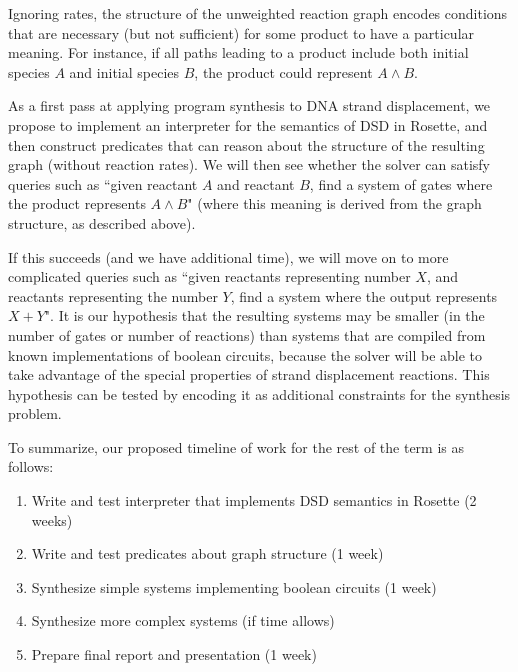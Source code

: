 \documentclass{article}
\begin{document}
Ignoring rates, the structure of the unweighted reaction graph encodes
conditions that are necessary (but not sufficient) for some product to have a
particular meaning. For instance, if all paths leading to a product include both
initial species $A$ and initial species $B$, the product could
represent $A \land B$.

As a first pass at applying program synthesis to DNA strand displacement, we
propose to implement an interpreter for the semantics of DSD in Rosette, and
then construct predicates that can reason about the structure of the resulting
graph (without reaction rates). We will then see whether the solver can satisfy
queries such as ``given reactant $A$ and reactant $B$, find a system of gates
where the product represents $A \land B$" (where this meaning is derived from
the graph structure, as described above).

If this succeeds (and we have additional time), we will move on to more
complicated queries such as ``given reactants representing number $X$, and
reactants representing the number $Y$, find a system where the output represents
$X + Y$".  It is our hypothesis that the resulting systems may be smaller (in
the number of gates or number of reactions) than systems that are compiled from
known implementations of boolean circuits, because the solver will be able
to take advantage of the special properties of strand displacement reactions.
This hypothesis can be tested by
encoding it as additional constraints for the synthesis problem.

To summarize, our proposed timeline of work for the rest of the term is as
follows:
\begin{enumerate}
\item
Write and test interpreter that implements DSD semantics in Rosette (2
weeks)

\item
Write and test predicates about graph structure (1 week)

\item
Synthesize simple systems implementing boolean circuits (1 week)

\item
Synthesize more complex systems (if time allows)

\item
Prepare final report and presentation (1 week)
\end{enumerate}
\end{document}
